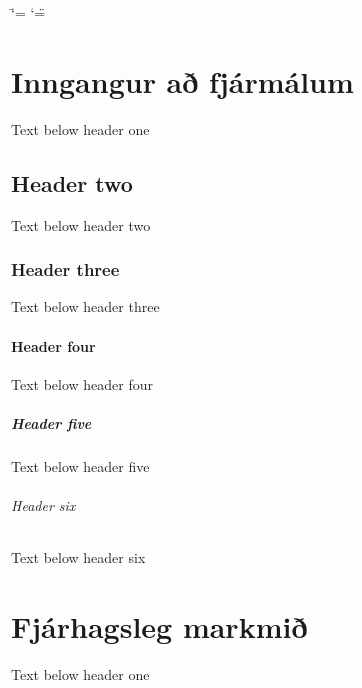 \documentclass[a4paper,10pt,icelandic]{sphinxmanual}
\date{}
\title{\newlinetitle{Economics\\Book}}
\date{maí 28, 2024}
\author{\newlineauthors{Author One\\Author Two}}
\begin{document}
\ifdefined\shorthandoff
  \ifnum\catcode`\=\string=\active\shorthandoff{=}\fi
  \ifnum\catcode`\"=\active{}\fi
\fi

\pagestyle{empty}
\sphinxmaketitle
\pagestyle{plain}
\sphinxtableofcontents
\pagestyle{normal}
\label{\detokenize{index::doc}}


\sphinxstepscope


\chapter{Inngangur að fjármálum}
\label{\detokenize{inngangur-ad-fjarmalum/index:inngangur-a-fjarmalum}}\label{\detokenize{inngangur-ad-fjarmalum/index::doc}}
\sphinxAtStartPar
Text below header one


\section{Header two}
\label{\detokenize{inngangur-ad-fjarmalum/index:header-two}}
\sphinxAtStartPar
Text below header two


\subsection{Header three}
\label{\detokenize{inngangur-ad-fjarmalum/index:header-three}}
\sphinxAtStartPar
Text below header three


\subsubsection{Header four}
\label{\detokenize{inngangur-ad-fjarmalum/index:header-four}}
\sphinxAtStartPar
Text below header four


\paragraph{Header five}
\label{\detokenize{inngangur-ad-fjarmalum/index:header-five}}
\sphinxAtStartPar
Text below header five


\subparagraph{Header six}
\label{\detokenize{inngangur-ad-fjarmalum/index:header-six}}
\sphinxAtStartPar
Text below header six

\sphinxstepscope


\chapter{Fjárhagsleg markmið}
\label{\detokenize{fjarhagsleg-markmid/index:fjarhagsleg-markmi}}\label{\detokenize{fjarhagsleg-markmid/index::doc}}
\sphinxAtStartPar
Text below header one
\end{document}
